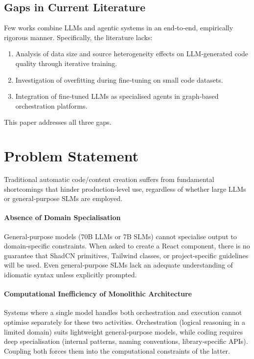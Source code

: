 \documentclass[pdflatex,sn-mathphys-num]{sn-jnl}
\theoremstyle{thmstyleone}
\theoremstyle{thmstyletwo}
\theoremstyle{thmstylethree}
\begin{document}
\subsection{Gaps in Current Literature}
Few works combine LLMs and agentic systems in an end‑to‑end, empirically rigorous manner. Specifically, the literature lacks:
\begin{enumerate}
    \item Analysis of data size and source heterogeneity effects on LLM‑generated code quality through iterative training.
    \item Investigation of overfitting during fine‑tuning on small code datasets.
    \item Integration of fine‑tuned LLMs as specialised agents in graph‑based orchestration platforms.
\end{enumerate}
This paper addresses all three gaps.

\section{Problem Statement}\label{sec:problem}

Traditional automatic code/content creation suffers from fundamental shortcomings that hinder production‑level use, regardless of whether large LLMs or general‑purpose SLMs are employed.

\paragraph{Absence of Domain Specialisation}
General‑purpose models (70B LLMs or 7B SLMs) cannot specialise output to domain‑specific constraints. When asked to create a React component, there is no guarantee that ShadCN primitives, Tailwind classes, or project‑specific guidelines will be used. Even general‑purpose SLMs lack an adequate understanding of idiomatic syntax unless explicitly prompted.

\paragraph{Computational Inefficiency of Monolithic Architecture}
Systems where a single model handles both orchestration and execution cannot optimise separately for these two activities. Orchestration (logical reasoning in a limited domain) suits lightweight general‑purpose models, while coding requires deep specialisation (internal patterns, naming conventions, library‑specific APIs). Coupling both forces them into the computational constraints of the latter.
\end{document}

